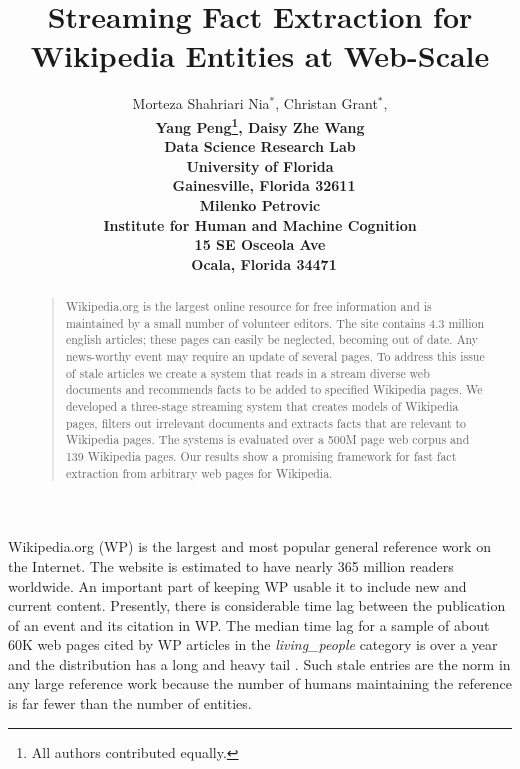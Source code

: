 \documentclass[letterpaper]{article}
\begin{document}
%
\title{Streaming Fact Extraction for Wikipedia Entities at Web-Scale}
\author{Morteza Shahriari Nia$^*$, Christan Grant$^*$, \\
\bf \large Yang Peng\thanks{All authors contributed equally.}, Daisy Zhe Wang\\
Data Science Research Lab\\
University of Florida\\\
Gainesville, Florida 32611\\
\And Milenko Petrovic\\
Institute for Human and Machine Cognition\\ 15 SE Osceola Ave \\\ Ocala, Florida 34471
}



\maketitle
\begin{abstract}
\begin{quote}
Wikipedia.org is the largest online resource for free information and is maintained by a small number of volunteer editors.
The site contains 4.3 million english articles; these pages can easily be neglected, becoming out of date.
Any news-worthy event may require an update of several pages.
To address this issue of stale articles we create a system that reads
in a stream diverse web documents and recommends
facts to be added to specified Wikipedia pages.
We developed a three-stage streaming system that creates models of Wikipedia pages,
filters out irrelevant documents and 
extracts facts that are relevant to Wikipedia pages.
The systems is evaluated over a 500M page web corpus and 139 Wikipedia pages.
Our results show a promising framework for fast fact extraction from arbitrary web pages for Wikipedia.

\end{quote}
\end{abstract}

\noindent 

Wikipedia.org (WP) is the largest and most popular general reference work on the Internet.
The website is estimated to have nearly 365 million readers worldwide.
An important part of keeping WP usable it to include new and current content.
Presently, there is considerable time lag between the publication of an event and its citation in WP\@.
The median time lag for a sample of about 60K web pages cited by
 WP articles in the \textit{living\_people} category is over a year
 and the distribution has a long and heavy tail
 \cite{frank2013building}.
Such stale entries are the norm in any large reference work because the number
of humans maintaining the reference is far fewer than the number of entities.
\end{document}
